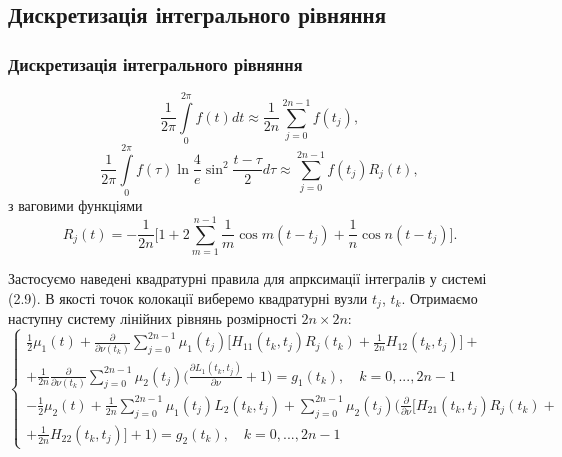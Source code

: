 \documentclass[10pt]{beamer}
\begin{document}
\subsection{Дискретизація інтегрального рівняння}
\begin{frame}
\frametitle{Дискретизація інтегрального рівняння}
\begin{equation*}
\displaystyle
\frac{1}{2\pi}\int\limits_{0}^{2\pi}f(t)dt\approx
\frac{1}{2n}\sum\limits_{j=0}^{2n-1}f(t_{j}),
\end{equation*}
\begin{equation*}
\displaystyle
\frac{1}{2\pi}\int\limits_{0}^{2\pi}f(\tau)\ln{\frac{4}{e}\sin^2\frac{t-\tau}{2}}d\tau\approx\sum\limits_{j=0}^{2n-1}f(t_{j})R_{j}(t),
\end{equation*}
з ваговими функціями
\begin{equation*}
\displaystyle
R_{j}(t) = -\frac{1}{2n}\Big[1+2\sum\limits_{m=1}^{n-1}{\frac{1}{m}\cos{m(t-t_{j})}} + \frac{1}{n}\cos{n(t-t_{j})}\Big].
\end{equation*}
\end{frame}

\begin{frame}
Застосуємо наведені квадратурні правила для апрксимації інтегралів у системі (2.9). В якості точок колокації виберемо квадратурні вузли $t_{j}$, $t_{k}$. Отримаємо наступну систему лінійних рівнянь розмірності $2n\times 2n$:
\begin{equation}
\left\{
\begin{array}{c}
\displaystyle
\frac{1}{2}\mu_1(t) + \frac{\partial}{\partial \nu(t_k)}\sum\limits_{j=0}^{2n-1} \mu_1(t_j)\Big[H_{11}(t_k,t_j)R_j(t_k)+\frac{1}{2n}H_{12}(t_k,t_j)\Big]+\\ + \frac{1}{2n}\frac{\partial}{\partial \nu(t_k)}\sum\limits_{j=0}^{2n-1} \mu_2(t_j)\bigg(\frac{\partial L_1(t_k,t_j)}{\partial \nu} + 1\bigg)
\displaystyle
= g_1(t_k), \quad k=0,...,2n-1\\
\displaystyle
-\frac{1}{2}\mu_2(t) + \frac{1}{2n}\sum\limits_{j=0}^{2n-1} \mu_1(t_j)L_2(t_k,t_j)+\sum\limits_{j=0}^{2n-1} \mu_2(t_j)\bigg(\frac{\partial}{\partial \nu}\Big[H_{21}(t_k,t_j)R_j(t_k)+\\+\frac{1}{2n}H_{22}(t_k,t_j)\Big] + 1 \bigg)
\displaystyle
=g_2(t_k), \quad k=0,...,2n-1
\end{array}
\right.
\end{equation}
\end{frame}
\end{document}
